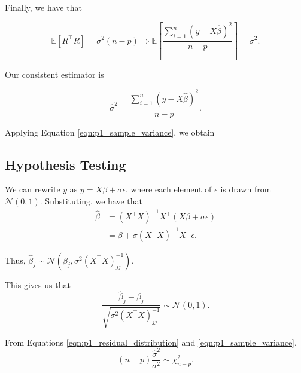 \documentclass[letterpaper,11pt]{article}
\begin{document}
\begin{enumerate}
\begin{enumerate}
\begin{description}
      Finally, we have that

      \begin{equation*}
        \mathbb{E}\left[R^\intercal R\right] = \sigma^2\left(n - p\right)
        \Rightarrow
        \mathbb{E}\left[\frac{\sum_{i=1}^n \left(y - X\hat{\beta}\right)^2}{n-p}\right] = \sigma^2.
      \end{equation*}

      Our consistent estimator is

      \begin{equation}
        \hat{\sigma}^2 = \frac{\sum_{i=1}^n \left(y - X\hat{\beta}\right)^2}{n-p}.
        \label{eqn:p1_sample_variance}
      \end{equation}

      Applying Equation \ref{eqn:p1_sample_variance}, we obtain

      \subsection*{Hypothesis Testing}

      We can rewrite $y$ as $y = X\beta + \sigma \epsilon$, where each element
      of $\epsilon$ is drawn from $\mathcal{N}\left(0, 1\right)$. Substituting,
      we have that
      \begin{align}
        \hat{\beta}
        &= \left(X^\intercal X\right)^{-1}X^\intercal\left(X\beta + \sigma\epsilon\right) \nonumber\\
        &= \beta + \sigma\left(X^\intercal X\right)^{-1}X^\intercal \epsilon.
          \label{eqn:p1_beta_hat_distribution}
      \end{align}

      Thus, $\hat{\beta}_j \sim \mathcal{N}\left(\beta_j, \sigma^2\left(X^\intercal X\right)^{-1}_{jj}\right)$.

      This gives us that
      \begin{equation*}
        \frac{\hat{\beta}_j - \beta_j}{\sqrt{\sigma^2\left(X^\intercal X\right)^{-1}_{jj}}} \sim
        \mathcal{N}\left(0, 1\right).
      \end{equation*}

      From Equations \ref{eqn:p1_residual_distribution} and \ref{eqn:p1_sample_variance},
      \begin{equation}
        (n - p)\frac{\hat{\sigma}^2}{\sigma^2} \sim \chi^2_{n-p}.
      \end{equation}


\end{description}
\end{enumerate}
\end{enumerate}
\end{document}
